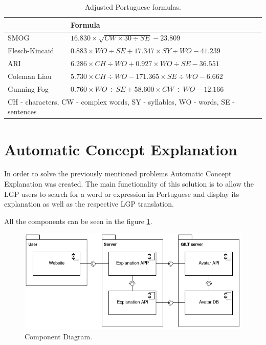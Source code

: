 \documentclass[runningheads]{llncs}
\begin{document}
\begin{table}
    \caption{Adjusted Portuguese formulas.}
    \label{table:ptformulas}
    \begin{tabular}{l|l}
        \hline
        {} & {\bfseries Formula} \\
        \hline
        SMOG & \(16.830 \times \sqrt{CW \times 30 \div SE} - 23.809\)  \\
        \hline
        Flesch-Kincaid & \(0.883 \times WO \div SE + 17.347 \times SY \div WO - 41.239\) \\
        \hline
        ARI & \(6.286 \times CH \div WO + 0.927 \times WO \div SE - 36.551\) \\
        \hline
        Coleman Liau & \(5.730 \times CH \div WO - 171.365 \times SE \div WO - 6.662\) \\
        \hline
        Gunning Fog & \(0.760 \times WO \div SE + 58.600 \times CW \div WO - 12.166\) \\
        \hline
        \multicolumn{2}{l}{CH - characters, CW - complex words, SY - syllables, WO - words, SE - sentences}
    \end{tabular}
\end{table}

\section{Automatic Concept Explanation}

In order to solve the previously mentioned problems Automatic Concept Explanation was created.
The main functionality of this solution is to allow the LGP users to search for a word or expression in Portuguese and display its explanation as well as the respective LGP translation.

All the components can be seen in the figure \ref{fig1}.

\begin{figure}[ht]
\centering
\includegraphics[scale=0.4]{component_diagram.png}
\caption{Component Diagram.} \label{fig1}
\end{figure}
\end{document}
